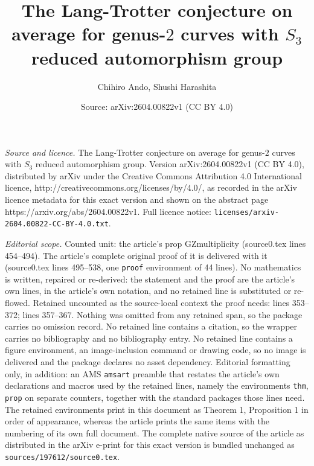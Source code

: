 \documentclass[10pt,a4paper]{amsart}
\title{The Lang-Trotter conjecture on average for genus-$2$ curves with $S_3$ reduced automorphism group}
\author{Chihiro Ando, Shushi Harashita}
\date{Source: arXiv:2604.00822v1 (CC BY 4.0)}
\begin{document}
\maketitle

\noindent\emph{Source and licence.} The Lang-Trotter conjecture on average for genus-$2$ curves with $S_3$ reduced automorphism group. Version arXiv:2604.00822v1 (CC BY 4.0), distributed by arXiv under the Creative Commons Attribution 4.0 International licence, http://creativecommons.org/licenses/by/4.0/, as recorded in the arXiv licence metadata for this exact version and shown on the abstract page https://arxiv.org/abs/2604.00822v1. Full licence notice: \texttt{licenses/arxiv-2604.00822-CC-BY-4.0.txt}.\par\smallskip

\noindent\textit{Editorial scope.} Counted unit: the article's prop GZmultiplicity (source0.tex lines 454--494). The article's complete original proof of it is delivered with it (source0.tex lines 495--538, one \texttt{proof} environment of 44 lines). No mathematics is written, repaired or re-derived: the statement and the proof are the article's own lines, in the article's own notation, and no retained line is substituted or re-flowed.  Retained uncounted as the source-local context the proof needs: lines 353--372; lines 357--367.  Nothing was omitted from any retained span, so the package carries no omission record.  No retained line contains a citation, so the wrapper carries no bibliography and no bibliography entry.  No retained line contains a figure environment, an image-inclusion command or drawing code, so no image is delivered and the package declares no asset dependency.  Editorial formatting only, in addition: an AMS \texttt{amsart} preamble that restates the article's own declarations and macros used by the retained lines, namely the environments \texttt{thm}, \texttt{prop} on separate counters, together with the standard packages those lines need.  The retained environments print in this document as Theorem 1, Proposition 1 in order of appearance, whereas the article prints the same items with the numbering of its own full document.  The complete native source of the article as distributed in the arXiv e-print for this exact version is bundled unchanged as \texttt{sources/197612/source0.tex}.
\end{document}

